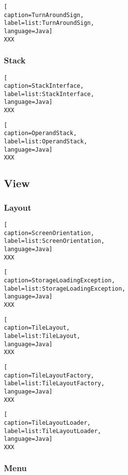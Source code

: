 \begin{lstlisting}[
caption=TurnAroundSign,
label=list:TurnAroundSign,
language=Java]
XXX
\end{lstlisting} 

\subsubsection{Stack}   

\begin{lstlisting}[
caption=StackInterface,
label=list:StackInterface,
language=Java]
XXX
\end{lstlisting}    

\begin{lstlisting}[
caption=OperandStack,
label=list:OperandStack,
language=Java]
XXX
\end{lstlisting} 

\subsection{View}

\subsubsection{Layout}

\begin{lstlisting}[
caption=ScreenOrientation,
label=list:ScreenOrientation,
language=Java]
XXX
\end{lstlisting}    

\begin{lstlisting}[
caption=StorageLoadingException,
label=list:StorageLoadingException,
language=Java]
XXX
\end{lstlisting}    

\begin{lstlisting}[
caption=TileLayout,
label=list:TileLayout,
language=Java]
XXX
\end{lstlisting}    

\begin{lstlisting}[
caption=TileLayoutFactory,
label=list:TileLayoutFactory,
language=Java]
XXX
\end{lstlisting}    

\begin{lstlisting}[
caption=TileLayoutLoader,
label=list:TileLayoutLoader,
language=Java]
XXX
\end{lstlisting}   

\subsubsection{Menu} 

